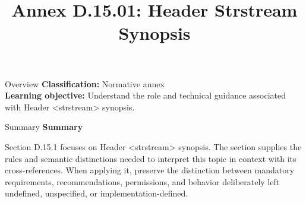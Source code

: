 \documentclass[10pt,letterpaper]{article}
\title{Annex D.15.01: Header Strstream Synopsis}
\author{}
\date{}
\begin{document}
\maketitle
\begin{CornellOverviewBox}{Overview}
\textbf{Classification:} Normative annex\\[2pt]
\textbf{Learning objective:} Understand the role and technical guidance associated with Header <strstream> synopsis.
\end{CornellOverviewBox}\begin{CornellSummaryBox}{Summary}
{\sffamily\bfseries\color{Accent} Summary}\par\vspace{3pt}Section D.15.1 focuses on Header <strstream> synopsis. The section supplies the rules and semantic distinctions needed to interpret this topic in context with its cross-references. When applying it, preserve the distinction between mandatory requirements, recommendations, permissions, and behavior deliberately left undefined, unspecified, or implementation-defined.
\end{CornellSummaryBox}
\end{document}
